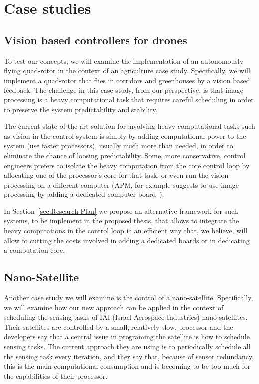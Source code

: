 \documentclass[11pt]{article}
\begin{document}
\section{Case studies}
\label{sec:Case study}

\subsection{Vision based controllers for drones}
To test our concepts, we will examine the implementation of an autonomously flying quad-rotor in the context of an agriculture case study. Specifically, we will implement a quad-rotor that flies in corridors and greenhouses by a vision based feedback. The challenge in this case study, from our perspective, is that image processing is a heavy computational task that requires careful scheduling in order to preserve the system predictability and stability.

The current state-of-the-art solution for involving heavy computational tasks such as vision in the control system is simply by adding computational power to the system (use faster processors), usually much more than needed, in order to eliminate the chance of loosing predictability.
Some, more conservative, control engineers prefers to isolate the heavy computation from the core control loop by allocating one of the processor's core for that task, or even run the vision processing on a different computer (APM, for example suggests to use image processing by adding a dedicated computer board~\cite{APM}).

In Section~\ref{sec:Research Plan} we propose an alternative framework for such systems, to be implement in the proposed thesis, that allows to integrate the heavy computations in the control loop in an efficient way that, we believe, will allow fo cutting the costs involved in adding a dedicated boards or in dedicating a computation core.

\subsection{Nano-Satellite}
Another case study we will examine is the control of a nano-satellite. Specifically, we will examine how our new approach can be applied in the context of scheduling the sensing tasks of IAI (Israel Aerospace Industries) nano satellites. Their satellites are controlled by a small, relatively slow, processor and the developers say that a central issue in programing the satellite is how to schedule  sensing tasks.
The current approach they are using is to periodically schedule all the sensing task every iteration, and they say that, because of sensor redundancy, this is the main computational consumption and is becoming to be too much for the capabilities of their processor.
\end{document}
